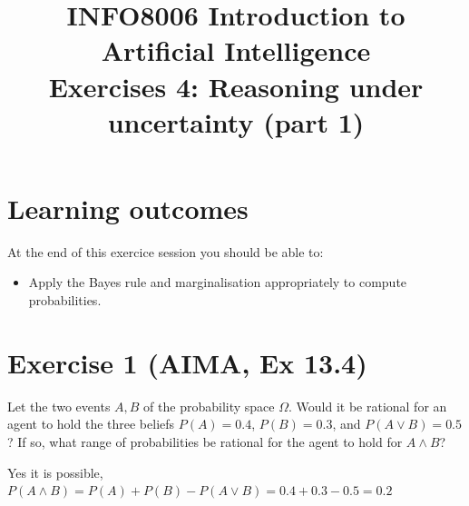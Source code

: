 \documentclass[9pt,a4paper]{extarticle}
\title{{\bf INFO8006 Introduction to Artificial Intelligence}\\[1em]
Exercises 4: Reasoning under uncertainty (part 1)}
\date{}
\newenvironment{solution}
    {%
    \color{red}
    }
    { 
    \color{black}
    }
\begin{document}
\maketitle
\vspace{-4em}

  \section*{Learning outcomes}
      At the end of this exercice session you should be able to:
      \begin{itemize}
          \item Apply the Bayes rule and marginalisation appropriately to compute probabilities.
      \end{itemize}
   \section*{Exercise 1 (AIMA, Ex 13.4)}
   Let the two events $A, B$ of the probability space $\Omega$. Would it be rational for an agent to hold the three beliefs $P(A)=0.4$, $P(B)=0.3$, and
    $P(A\vee B)=0.5$? If so, what range of probabilities be rational for the agent to hold for $A\wedge B$?
    \begin{solution}
\def\firstcircle{(0,0) circle (1.5cm)}
\def\secondcircle{(0:2cm) circle (1.5cm)}



\setlength{\parskip}{5mm}


Yes it is possible, $P(A \land B) = P(A) + P(B) - P(A \lor B) = 0.4 + 0.3 - 0.5 = 0.2$
    \end{solution}
\end{document}
